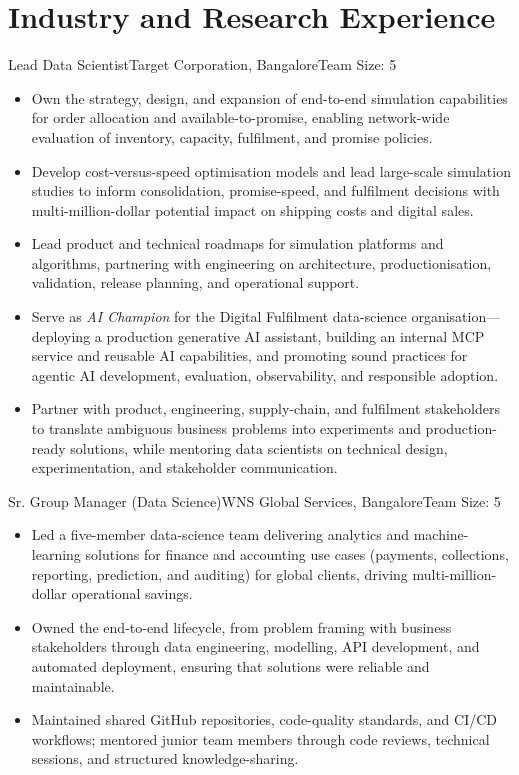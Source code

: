 \documentclass[11pt,a4paper]{moderncv}
\begin{document}
\hypertarget{industry-and-research-experience}{
\section{Industry and Research
Experience}\label{industry-and-research-experience}}

\nopagebreak
    {Lead Data Scientist}{Target Corporation, Bangalore}{}{Team Size: 5}{
    \begin{itemize}
        \item Own the strategy, design, and expansion of end-to-end simulation capabilities for order allocation and available-to-promise, enabling network-wide evaluation of inventory, capacity, fulfilment, and promise policies.
        \item Develop cost-versus-speed optimisation models and lead large-scale simulation studies to inform consolidation, promise-speed, and fulfilment decisions with multi-million-dollar potential impact on shipping costs and digital sales.
        \item Lead product and technical roadmaps for simulation platforms and algorithms, partnering with engineering on architecture, productionisation, validation, release planning, and operational support.
        \item Serve as \textit{AI Champion} for the Digital Fulfilment data-science organisation---deploying a production generative AI assistant, building an internal MCP service and reusable AI capabilities, and promoting sound practices for agentic AI development, evaluation, observability, and responsible adoption.
        \item Partner with product, engineering, supply-chain, and fulfilment stakeholders to translate ambiguous business problems into experiments and production-ready solutions, while mentoring data scientists on technical design, experimentation, and stakeholder communication.
    \end{itemize}
    }

    {Sr. Group Manager (Data Science)}{WNS Global Services, Bangalore}{}{Team Size: 5}{
    \begin{itemize}
        \item Led a five-member data-science team delivering analytics and machine-learning solutions for finance and accounting use cases (payments, collections, reporting, prediction, and auditing) for global clients, driving multi-million-dollar operational savings.
        \item Owned the end-to-end lifecycle, from problem framing with business stakeholders through data engineering, modelling, API development, and automated deployment, ensuring that solutions were reliable and maintainable.
        \item Maintained shared GitHub repositories, code-quality standards, and CI/CD workflows; mentored junior team members through code reviews, technical sessions, and structured knowledge-sharing.
    \end{itemize}
    }
\end{document}
